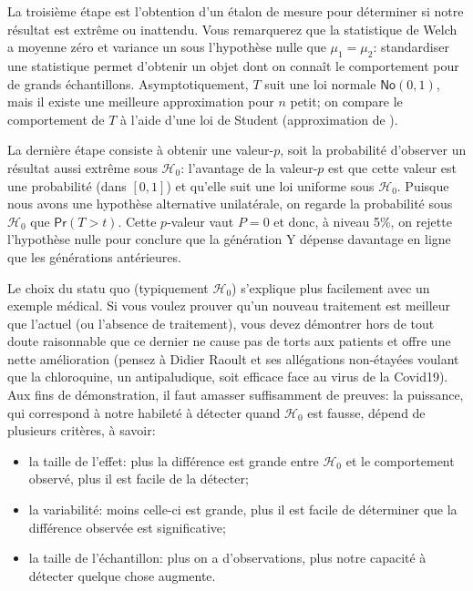\documentclass[
  11pt,
  letterpaper,
]{book}
\providecommand{\tightlist}{%
  \setlength{\itemsep}{0pt}\setlength{\parskip}{0pt}}
\begin{document}
La troisième étape est l'obtention d'un étalon de mesure pour déterminer si notre résultat est extrême ou inattendu. Vous remarquerez que la statistique de Welch a moyenne zéro et variance un sous l'hypothèse nulle que \(\mu_1=\mu_2\): standardiser une statistique permet d'obtenir un objet dont on connaît le comportement pour de grands échantillons.
Asymptotiquement, \(T\) suit une loi normale \(\mathsf{No}(0, 1)\), mais il existe une meilleure approximation pour \(n\) petit; on compare le comportement de \(T\) à l'aide d'une loi de Student (approximation de \citet{Satterthwaite:1946}).

La dernière étape consiste à obtenir une valeur-\(p\), soit la probabilité d'observer un résultat aussi extrême sous \(\mathscr{H}_0\): l'avantage de la valeur-\(p\) est que cette valeur est une probabilité (dans \([0, 1]\)) et qu'elle suit une loi uniforme sous \(\mathscr{H}_0\). Puisque nous avons une hypothèse alternative unilatérale, on regarde la probabilité sous \(\mathscr{H}_0\) que \(\mathsf{Pr}(T > t)\). Cette \(p\)-valeur vaut \(P=0\) et donc, à niveau 5\%, on rejette l'hypothèse nulle pour conclure que la génération Y dépense davantage en ligne que les générations antérieures.

Le choix du statu quo (typiquement \(\mathscr{H}_0\)) s'explique plus facilement avec un exemple médical. Si vous voulez prouver qu'un nouveau traitement est meilleur que l'actuel (ou l'absence de traitement), vous devez démontrer hors de tout doute raisonnable que ce dernier ne cause pas de torts aux patients et offre une nette amélioration (pensez à Didier Raoult et ses allégations non-étayées voulant que la chloroquine, un antipaludique, soit efficace face au virus de la Covid19). Aux fins de démonstration, il faut amasser suffisamment de preuves: la puissance, qui correspond à notre habileté à détecter quand \(\mathscr{H}_0\) est fausse, dépend de plusieurs critères, à savoir:

\begin{itemize}
\tightlist
\item
  la taille de l'effet: plus la différence est grande entre \(\mathscr{H}_0\) et le comportement observé, plus il est facile de la détecter;
\item
  la variabilité: moins celle-ci est grande, plus il est facile de déterminer que la différence observée est significative;
\item
  la taille de l'échantillon: plus on a d'observations, plus notre capacité à détecter quelque chose augmente.
\end{itemize}
\end{document}

